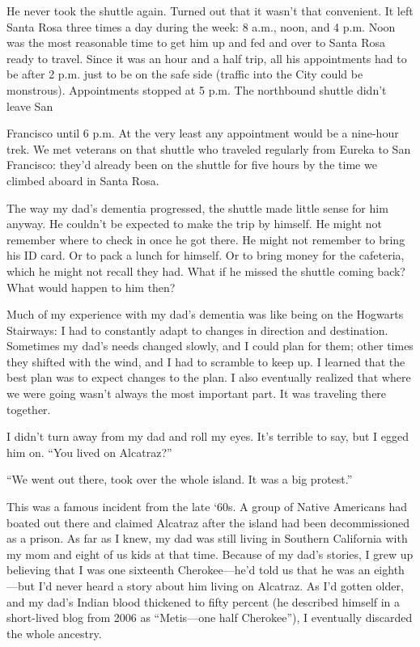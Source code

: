 \documentclass[12pt]{book}
\begin{document}
He never took the shuttle again. Turned out that it wasn't that convenient. It left Santa Rosa three times a day during the week: 8 a.m., noon, and 4 p.m. Noon was the most reasonable time to get him up and fed and over to Santa Rosa ready to travel. Since it was an hour and a half trip, all his appointments had to be after 2 p.m. just to be on the safe side (traffic into the City could be monstrous). Appointments stopped at 5 p.m. The northbound shuttle didn't leave San

Francisco until 6 p.m. At the very least any appointment would be a nine-hour trek. We met veterans on that shuttle who traveled regularly from Eureka to San Francisco: they'd already been on the shuttle for five hours by the time we climbed aboard in Santa Rosa.

The way my dad's dementia progressed, the shuttle made little sense for him anyway. He couldn't be expected to make the trip by himself. He might not remember where to check in once he got there. He might not remember to bring his ID card. Or to pack a lunch for himself. Or to bring money for the cafeteria, which he might not recall they had. What if he missed the shuttle coming back? What would happen to him then?

Much of my experience with my dad's dementia was like being on the Hogwarts Stairways: I had to constantly adapt to changes in direction and destination. Sometimes my dad's needs changed slowly, and I could plan for them; other times they shifted with the wind, and I had to scramble to keep up. I learned that the best plan was to expect changes to the plan. I also eventually realized that where we were going wasn't always the most important part. It was traveling there together.

I didn't turn away from my dad and roll my eyes. It's terrible to say, but I egged him on. ``You lived on Alcatraz?''

``We went out there, took over the whole island. It was a big protest.''

This was a famous incident from the late `60s. A group of Native Americans had boated out there and claimed Alcatraz after the island had been decommissioned as a prison. As far as I knew, my dad was still living in Southern California with my mom and eight of us kids at that time. Because of my dad's stories, I grew up believing that I was one sixteenth Cherokee---he'd told us that he was an eighth---but I'd never heard a story about him living on Alcatraz. As I'd gotten older, and my dad's Indian blood thickened to fifty percent (he described himself in a short-lived blog from 2006 as ``Metis---one half Cherokee''), I eventually discarded the whole ancestry.
\end{document}

